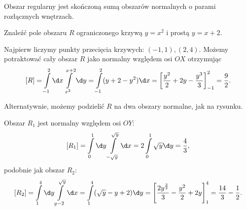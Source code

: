 \begin{definition}
    Obszar regularny jest skończoną sumą obszarów normalnych o parami rozłącznych wnętrzach.
\end{definition}

\begin{example}
    Znaleźć pole obszaru $R$ ograniczonego krzywą $y = x^2$ i prostą $y = x + 2$.
\end{example}
\begin{solution}
    Najpierw liczymy punkty przecięcia krzywych: $(-1, 1), (2, 4)$. Możemy potraktować cały obszar $R$ jako normalny względem osi $OX$ otrzymując
    \[ [R] = \int\limits_{-1}^2 \d x \int\limits_{x^2}^{x+2} \d y = \int\limits_{-1}^2 (y + 2 - y^2) \d x = \left[\frac{y^2}{2} + 2y - \frac{y^3}{3}\right]_{-1}^2 = \frac{9}{2}. \]

    Alternatywnie, możemy podzielić $R$ na dwa obszary normalne, jak na rysunku.
    \begin{center}
    \end{center}
    Obszar $R_1$ jest normalny względem osi $OY$:
    \[ [R_1] = \int\limits_0^1 \d y \int\limits_{-\sqrt{y}}^{\sqrt{y}} \d x = 2 \int\limits_0^1 \sqrt{y} \d y = \frac{4}{3}, \]
    podobnie jak obszar $R_2$:
    \[ [R_2] = \int\limits_1^4 \d y \int\limits_{y-2}^{\sqrt{y}} \d x = \int\limits_1^4 (\sqrt{y} - y + 2) \d y = \left[\frac{2y^{\frac{3}{2}}}{3} - \frac{y^2}{2} + 2y\right]_1^4 = \frac{14}{3} - \frac{1}{2}. \]
\end{solution}

